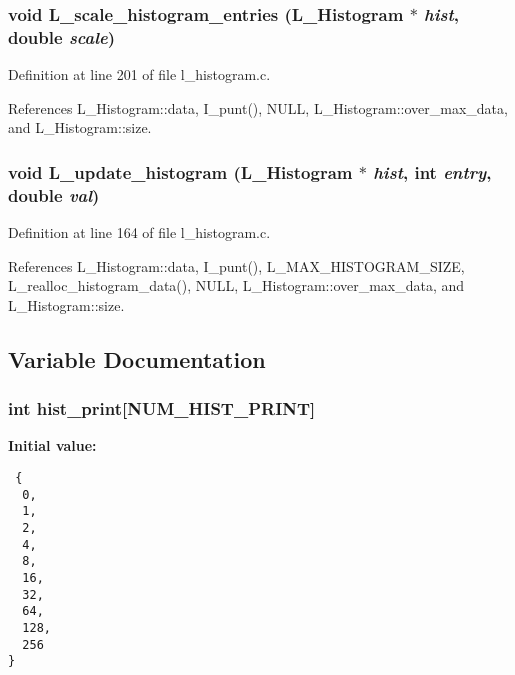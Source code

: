 \subsubsection{\setlength{\rightskip}{0pt plus 5cm}void L\_\-scale\_\-histogram\_\-entries (\bf{L\_\-Histogram} $\ast$ {\em hist}, double {\em scale})}\label{l__histogram_8c_a1cdf4d279477d701637e1461c4c29c3}




Definition at line 201 of file l\_\-histogram.c.

References L\_\-Histogram::data, I\_\-punt(), NULL, L\_\-Histogram::over\_\-max\_\-data, and L\_\-Histogram::size.
\subsubsection{\setlength{\rightskip}{0pt plus 5cm}void L\_\-update\_\-histogram (\bf{L\_\-Histogram} $\ast$ {\em hist}, int {\em entry}, double {\em val})}\label{l__histogram_8c_16b10fa8c905eba042950f47899b88e2}




Definition at line 164 of file l\_\-histogram.c.

References L\_\-Histogram::data, I\_\-punt(), L\_\-MAX\_\-HISTOGRAM\_\-SIZE, L\_\-realloc\_\-histogram\_\-data(), NULL, L\_\-Histogram::over\_\-max\_\-data, and L\_\-Histogram::size.

\subsection{Variable Documentation}
\subsubsection{\setlength{\rightskip}{0pt plus 5cm}int \bf{hist\_\-print}[NUM\_\-HIST\_\-PRINT]\hspace{0.3cm}{\tt  [static]}}\label{l__histogram_8c_2a3e2512e486858225365aeed752bf4d}


\textbf{Initial value:}

\begin{Code}\begin{verbatim} {
  0,
  1,
  2,
  4,
  8,
  16,
  32,
  64,
  128,
  256
}
\end{verbatim}\end{Code}


